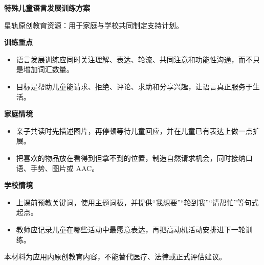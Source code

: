 \documentclass[11pt]{article}
\begin{document}
{\color[HTML]{1F5FD2}\LARGE\bfseries 特殊儿童语言发展训练方案\par}
{\color[HTML]{667085}\small 星轨原创教育资源：用于家庭与学校共同制定支持计划。\par}
\vspace{0.8em}
{\color[HTML]{111827}\large\bfseries 训练重点\par}
\begin{itemize}
\item 语言发展训练应同时关注理解、表达、轮流、共同注意和功能性沟通，而不只是增加词汇数量。
\item 目标是帮助儿童能请求、拒绝、评论、求助和分享兴趣，让语言真正服务于生活。
\end{itemize}
{\color[HTML]{111827}\large\bfseries 家庭情境\par}
\begin{itemize}
\item 亲子共读时先描述图片，再停顿等待儿童回应，并在儿童已有表达上做一点扩展。
\item 把喜欢的物品放在看得到但拿不到的位置，制造自然请求机会，同时接纳口语、手势、图片或 AAC。
\end{itemize}
{\color[HTML]{111827}\large\bfseries 学校情境\par}
\begin{itemize}
\item 上课前预教关键词，使用主题词板，并提供“我想要”“轮到我”“请帮忙”等句式起点。
\item 教师应记录儿童在哪些活动中最愿意表达，再把高动机活动安排进下一轮训练。
\end{itemize}
\vfill
{\color[HTML]{667085}\footnotesize 本材料为应用内原创教育内容，不能替代医疗、法律或正式评估建议。\par}
\end{document}
